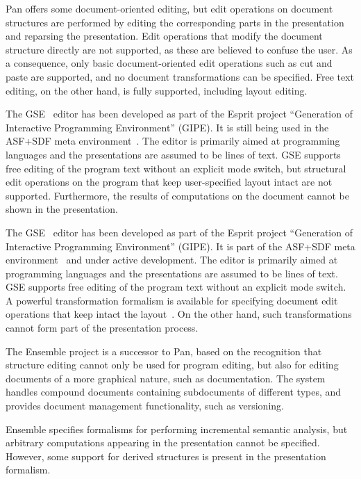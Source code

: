\documentclass{entcs}
\begin{document}
Pan offers some document-oriented editing, but edit operations on document structures are performed by editing the corresponding parts in the presentation and reparsing the presentation. Edit operations that modify the document structure directly are not supported, as these are believed to confuse the user. As a consequence, only basic document-oriented edit operations such as cut and paste are supported, and no document transformations can be specified. Free text editing, on the other hand, is fully supported, including layout editing. 


\bc
The GSE~\cite{koorn92gse} editor has been developed as part of the Esprit project ``Generation of Interactive Programming Environment'' (GIPE). It is still being used in the ASF+SDF meta environment~\cite{klint93asfsdf}. The editor is primarily aimed at programming languages and the presentations are assumed to be lines of text. GSE supports free editing of the program text without an explicit mode switch, but structural edit operations on the program that keep user-specified layout intact are not supported. Furthermore, the results of computations on the document cannot be shown in the presentation. \ec

The GSE~\cite{koorn92gse} editor has been developed as part of the Esprit project ``Generation of Interactive Programming Environment'' (GIPE). It is part of the ASF+SDF meta environment~\cite{klint93asfsdf} and under active development. The editor is primarily aimed at programming languages and the presentations are assumed to be lines of text. GSE supports free editing of the program text without an explicit mode switch. A powerful transformation formalism is available for specifying document edit operations that keep intact the layout~\cite{brand00rewriteLayout}. On the other hand, such transformations cannot form part of the presentation process.



The Ensemble project is a successor to Pan, based on the recognition that structure editing cannot only be used for program editing, but also for editing documents of a more graphical nature, such as documentation. The system handles compound documents containing subdocuments of different types, and provides document management functionality, such as versioning.

Ensemble specifies formalisms for performing incremental semantic analysis, but arbitrary computations appearing in the presentation cannot be specified. However, some support for derived structures is present in the presentation formalism.
\end{document}
